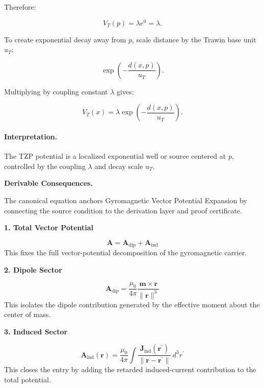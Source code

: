 Therefore:

\begin{equation}
V_T(p)=\lambda e^0=\lambda .
\end{equation}

To create exponential decay away from $p$, scale distance by the Trawin base unit $u_T$:

\begin{equation}
\exp\left(-\frac{d(x,p)}{u_T}\right).
\end{equation}

Multiplying by coupling constant $\lambda$ gives:

\begin{equation}
\boxed{
V_T(x)
=
\lambda
\exp\left(
-\frac{d(x,p)}{u_T}
\right).
}
\end{equation}

\paragraph{Interpretation.}
The TZP potential is a localized exponential well or source centered at $p$, controlled by the coupling $\lambda$ and decay scale $u_T$.

\par\vspace{0.35em}
\noindent\textbf{Derivable Consequences.}\quad
\begingroup
\footnotesize
\raggedright
The canonical equation anchors Gyromagnetic Vector Potential Expansion by connecting the source condition to the derivation layer and proof certificate.
\par\endgroup

\noindent\textbf{1. Total Vector Potential}\par
\[
\mathbf{A}=\mathbf{A}_{\mathrm{dip}}+\mathbf{A}_{\mathrm{ind}}
\]
\noindent This fixes the full vector-potential decomposition of the gyromagnetic carrier.\par
\noindent\textbf{2. Dipole Sector}\par
\[
\mathbf{A}_{\mathrm{dip}}=\frac{\mu_{0}}{4\pi}\frac{\mathbf{m}\times\mathbf{r}}{\lVert\mathbf{r}\rVert^{3}}
\]
\noindent This isolates the dipole contribution generated by the effective moment about the center of mass.\par
\noindent\textbf{3. Induced Sector}\par
\[
\mathbf{A}_{\mathrm{ind}}(\mathbf{r})=\frac{\mu_{0}}{4\pi}\int \frac{\mathbf{J}_{\mathrm{ind}}(\mathbf{r}^{\prime})}{\lVert\mathbf{r}-\mathbf{r}^{\prime}\rVert}\,d^{3}r^{\prime}
\]
\noindent This closes the entry by adding the retarded induced-current contribution to the total potential.\par

